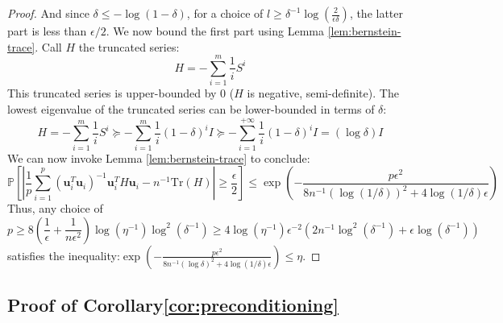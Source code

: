 \begin{proof}
And since $\delta\le-\log\left(1-\delta\right)$, for a choice of
$l\geq\delta^{-1}\log\left(\frac{2}{\epsilon\delta}\right)$, the
latter part is less than $\epsilon/2$. We now bound the first part
using Lemma \ref{lem:bernstein-trace}. Call $H$ the truncated series:
\[
H=-\sum_{i=1}^{m}\frac{1}{i}S^{i}
\]
This truncated series is upper-bounded by $0$ ($H$ is negative,
semi-definite). The lowest eigenvalue of the truncated series can
be lower-bounded in terms of $\delta$: 
\[
H=-\sum_{i=1}^{m}\frac{1}{i}S^{i}\succeq-\sum_{i=1}^{m}\frac{1}{i}\left(1-\delta\right)^{i}I\succeq-\sum_{i=1}^{+\infty}\frac{1}{i}\left(1-\delta\right)^{i}I=\left(\log\delta\right)I
\]
We can now invoke Lemma \ref{lem:bernstein-trace} to conclude: 
\[
\mathbb{P}\left[\left|\frac{1}{p}\sum_{i=1}^{p}\left(\mathbf{u}_{i}^{T}\mathbf{u}_{i}\right)^{-1}\mathbf{u}_{i}^{T}H\mathbf{u}_{i}-n^{-1}\mbox{Tr}\left(H\right)\right|\geq\frac{\epsilon}{2}\right]\leq\exp\left(-\frac{p\epsilon^{2}}{8n^{-1}\left(\log\left(1/\delta\right)\right)^{2}+4\log\left(1/\delta\right)\epsilon}\right)
\]
Thus, any choice of 
\[
p\geq8\left(\frac{1}{\epsilon}+\frac{1}{n\epsilon^{2}}\right)\log\left(\eta^{-1}\right)\log^{2}\left(\delta^{-1}\right)\geq4\log\left(\eta^{-1}\right)\epsilon^{-2}\left(2n^{-1}\log^{2}\left(\delta^{-1}\right)+\epsilon\log\left(\delta^{-1}\right)\right)
\]
satisfies the inequality:$\exp\left(-\frac{p\epsilon^{2}}{8n^{-1}\left(\log\delta\right)^{2}+4\log\left(1/\delta\right)\epsilon}\right)\leq\eta$.

\end{proof}


\subsection{Proof of Corollary\ref{cor:preconditioning}}

